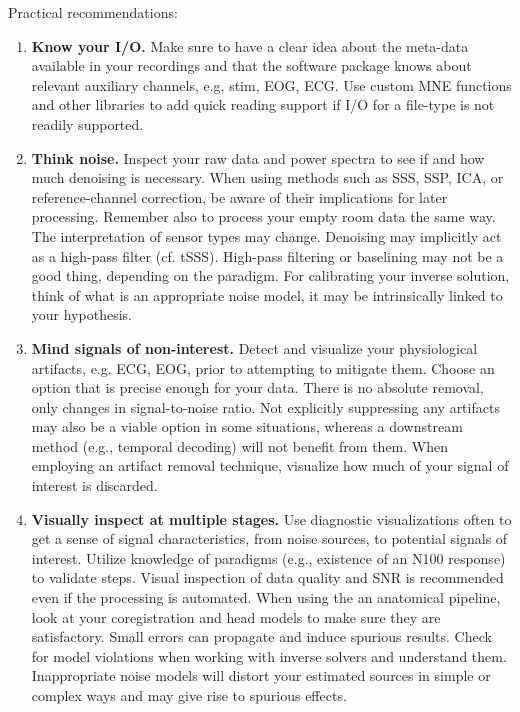 Practical recommendations:
\begin{enumerate}
\item \textbf{Know your I/O.} Make sure to have a clear idea about the meta-data available
in your recordings and that the software package knows about relevant auxiliary channels, e.g, stim, EOG, ECG.
Use custom MNE functions and other libraries to add quick reading support if I/O for a file-type is 
not readily supported.

\item \textbf{Think noise.} Inspect your raw data and power spectra to see if and how much
denoising is necessary.
When using methods such as SSS, SSP, ICA, or reference-channel correction, be aware of their implications 
for later processing. Remember also to process your empty room data the same way. The 
interpretation of sensor types may change. Denoising may implicitly act as a high-pass filter (cf. tSSS).
High-pass filtering or baselining may not be a good thing, depending on the paradigm. For calibrating your inverse solution, 
think of what is an appropriate noise model, it may be intrinsically linked to your hypothesis. 

\item \textbf{Mind signals of non-interest.} Detect and visualize your physiological artifacts, e.g. ECG, 
EOG, prior to attempting to mitigate them. Choose an option that is precise enough for your data. 
There is no absolute removal, only changes in signal-to-noise ratio. Not explicitly suppressing 
any artifacts may also be a viable option in some situations, whereas a downstream method (e.g., temporal decoding) will not benefit from them. When employing an artifact removal technique,  
visualize how much of your signal of interest is discarded.

\item \textbf{Visually inspect at multiple stages.} Use diagnostic visualizations often to get a sense of signal characteristics, from noise sources, to potential signals of interest. Utilize knowledge of paradigms (e.g., existence of an N100 response) to validate steps. Visual inspection of data quality and SNR is recommended even if the processing is automated. When using the an anatomical pipeline, look at your coregistration and head models to make sure they are satisfactory. Small errors can propagate and induce spurious results. Check for model violations when working with inverse solvers and understand them. Inappropriate noise models will distort your estimated sources in simple or complex ways and may give rise to spurious effects.


\end{enumerate}
